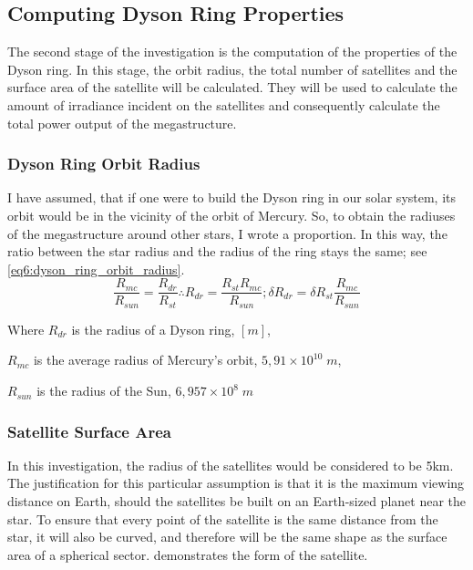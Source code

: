 \documentclass[stu, 11pt, a4paper, floatsintext, noextraspace]{apa7}
\begin{document}
	\subsection{Computing Dyson Ring Properties}
	The second stage of the investigation is the computation of the properties of the Dyson ring. In this stage, the orbit radius, the total number of satellites and the surface area of the satellite will be calculated. They will be used to calculate the amount of irradiance incident on the satellites and consequently calculate the total power output of the megastructure.
	\subsubsection{Dyson Ring Orbit Radius}
	I have assumed, that if one were to build the Dyson ring in our solar system, its orbit would be in the vicinity of the orbit of Mercury. So, to obtain the radiuses of the megastructure around other stars, I wrote a proportion. In this way, the ratio between the star radius and the radius of the ring stays the same; see \cref{eq6:dyson_ring_orbit_radius}.
	\begin{equation}
		\label{eq6:dyson_ring_orbit_radius}
		\frac{R_{mc}}{R_{sun}}=\frac{R_{dr}}{R_{st}} \therefore R_{dr}=\frac{R_{st}R_{mc}}{R_{sun}}; \delta R_{dr}=\delta R_{st}\frac{R_{mc}}{R_{sun}}
	\end{equation}
	\begin{center}
		Where $R_{dr}$ is the radius of a Dyson ring, $[m]$,
		
		$R_{mc}$ is the average radius of Mercury's orbit, $5,91\times10^{10}\;m$,
		
 		$R_{sun}$ is the radius of the Sun, $6,957\times10^8\;m$
	\end{center}
	\subsubsection{Satellite Surface Area}
	In this investigation, the radius of the satellites would be considered to be 5km. The justification for this particular assumption is that it is the maximum viewing distance on Earth, should the satellites be built on an Earth-sized planet near the star. To ensure that every point of the satellite is the same distance from the star, it will also be curved, and therefore will be the same shape as the surface area of a spherical sector.  demonstrates the form of the satellite.
	
\end{document}
